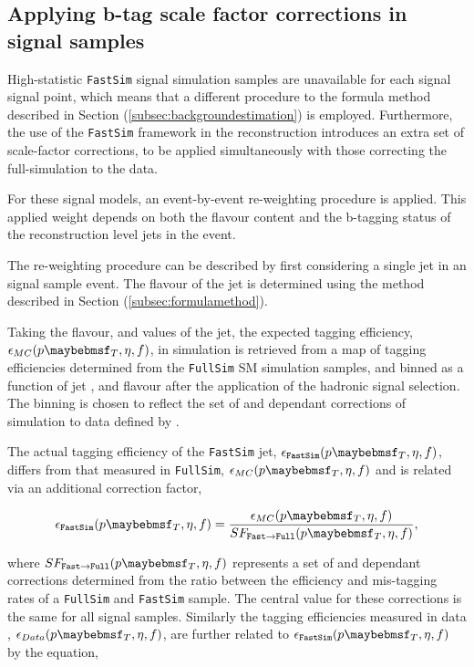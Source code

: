 \subsection{Applying b-tag scale factor corrections in signal samples}
\label{subsec:smsbtagreweighting}

High-statistic \texttt{FastSim} signal simulation samples are unavailable for each signal signal point, which means that a different procedure to the formula method described in Section (\ref{subsec:backgroundestimation}) is employed. Furthermore, the use of the \texttt{FastSim} framework in the reconstruction introduces an extra set of scale-factor corrections, to be applied simultaneously with those correcting the full-simulation to the data. 

For these signal models, an event-by-event re-weighting procedure is applied. This applied weight depends on both the flavour content and the b-tagging status of the reconstruction level jets in the event. 

The re-weighting procedure can be described by first considering a single jet in an signal sample event. The flavour of the jet is determined using the method described in Section (\ref{subsec:formulamethod}). 

Taking the flavour, \pt and \eta values of the jet, the expected tagging efficiency, $\epsilon_{MC}(\pt,\eta,f)$, in simulation is retrieved from a map of tagging efficiencies determined from the \texttt{FullSim} \ac{SM} simulation samples, and binned as a function of jet \pt, \eta and flavour after the application of the hadronic signal selection. The binning is chosen to reflect the set of \pt and \eta dependant corrections of simulation to data defined by \cite{btagscalefactor}.

The actual tagging efficiency of the \texttt{FastSim} jet, $\epsilon_{\texttt{FastSim}}(\pt,\eta,f)$, differs from that measured in \texttt{FullSim},  $\epsilon_{MC}(\pt,\eta,f)$ and is related via an additional correction factor,

\begin{equation}
\epsilon_{\texttt{FastSim}}(\pt,\eta,f) =  \frac{\epsilon_{MC}(\pt,\eta,f)}{SF_{\texttt{Fast}\rightarrow\texttt{Full}}(\pt,\eta,f)} ,
\end{equation}

where $SF_{\texttt{Fast}\rightarrow\texttt{Full}}(\pt,\eta,f)$ represents a set of \pt and \eta dependant corrections determined from the ratio between the efficiency and mis-tagging rates of a \ttbar \texttt{FullSim} and \ttbar \texttt{FastSim} sample. The central value for these corrections is the same for all signal samples. Similarly the tagging efficiencies measured in data \cite{btag8tev}, $\epsilon_{Data}(\pt,\eta,f)$, are further related to $\epsilon_{\texttt{FastSim}}(\pt,\eta,f)$ by the equation,

